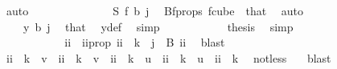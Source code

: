 \begin{isabellebody}
\ auto\isanewline
\ \ \ \ \ \ \ \ \isamarkupfalse%
\ \isamarkupfalse%
\ {\isachardoublequoteopen}\ {\isachardot}{\kern0pt}{\isachardot}{\kern0pt}{\isachardot}{\kern0pt}\ {\isacharequal}{\kern0pt}\ S\ {\isacharparenleft}{\kern0pt}{\isacharquery}{\kern0pt}f\ b{\isacharparenright}{\kern0pt}\ j{\isachardoublequoteclose}\ \isamarkupfalse%
\ Bf{\isacharunderscore}{\kern0pt}props{\isacharparenleft}{\kern0pt}{}{\isacharparenright}{\kern0pt}\ f{\isacharunderscore}{\kern0pt}cube\ {}\ that{\isacharparenleft}{\kern0pt}{}{\isacharparenright}{\kern0pt}\ \isamarkupfalse%
\ auto\isanewline
\ \ \ \ \ \ \ \ \isamarkupfalse%
\ \isamarkupfalse%
\ {\isachardoublequoteopen}\ {\isachardot}{\kern0pt}{\isachardot}{\kern0pt}{\isachardot}{\kern0pt}\ {\isacharequal}{\kern0pt}\ y\ b\ j{\isachardoublequoteclose}\ \isamarkupfalse%
\ that{\isacharparenleft}{\kern0pt}{}{\isacharparenright}{\kern0pt}\ \isamarkupfalse%
\ y{\isacharunderscore}{\kern0pt}def\ \isamarkupfalse%
\ simp\isanewline
\ \ \ \ \ \ \ \ \isamarkupfalse%
\ \isamarkupfalse%
\ {\isacharquery}{\kern0pt}thesis\ \isamarkupfalse%
\ simp\isanewline
\ \ \ \ \ \ \isamarkupfalse%
\isanewline
\ \ \ \ \ \ \ \ \isamarkupfalse%
\ {}\isanewline
\ \ \ \ \ \ \ \ \isamarkupfalse%
\ \isamarkupfalse%
\ ii\ \ ii{\isacharunderscore}{\kern0pt}prop{\isacharcolon}{\kern0pt}{\isachardoublequoteopen}\ ii\ {\isacharless}{\kern0pt}\ k\ {\isasymand}\ j\ {\isasymin}\ B\ ii{\isachardoublequoteclose}\ \isamarkupfalse%
\ blast\isanewline
\ \ \ \ \ \ \ \ \isamarkupfalse%
\ \isamarkupfalse%
\ {\isachardoublequoteopen}ii\ {\isacharless}{\kern0pt}\ k\ {\isacharminus}{\kern0pt}\ v{\isachardoublequoteclose}\ {\isacharbar}{\kern0pt}\ {\isachardoublequoteopen}ii\ {\isasymge}\ k\ {\isacharminus}{\kern0pt}\ v\ {\isasymand}\ ii\ {\isacharless}{\kern0pt}\ k\ {\isacharminus}{\kern0pt}\ u{\isachardoublequoteclose}\ {\isacharbar}{\kern0pt}\ {\isachardoublequoteopen}ii\ {\isasymge}\ k\ {\isacharminus}{\kern0pt}\ u\ {\isasymand}\ ii\ {\isacharless}{\kern0pt}\ k{\isachardoublequoteclose}\ \isamarkupfalse%
\ not{\isacharunderscore}{\kern0pt}less\ \ \isamarkupfalse%
\ blast\isanewline
\ \ \ \ \ \ \ \ \isamarkupfalse%
\ \isamarkupfalse%

\end{isabellebody}
